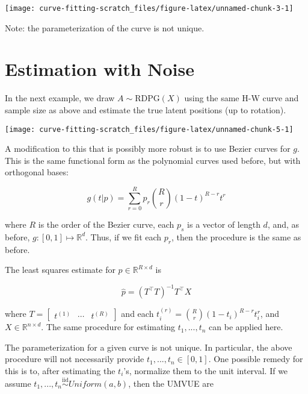 \documentclass[
  11pt,
]{article}
\begin{document}
\begin{center}\texttt{[image: curve-fitting-scratch\_files/figure-latex/unnamed-chunk-3-1]} \end{center}

Note: the parameterization of the curve is not unique.

\hypertarget{estimation-with-noise}{%
\section{Estimation with Noise}\label{estimation-with-noise}}

\begin{example}

In the next example, we draw $A \sim \mathrm{RDPG}(X)$ using the same H-W curve and sample size as above and estimate the true latent positions (up to rotation). 

\end{example}

\begin{center}\texttt{[image: curve-fitting-scratch\_files/figure-latex/unnamed-chunk-5-1]} \end{center}

A modification to this that is possibly more robust is to use Bezier
curves for \(g\). This is the same functional form as the polynomial
curves used before, but with orthogonal bases:

\[g(t | p) = \sum_{r = 0}^{R} p_r \binom{R}{r} (1 - t)^{R - r} t^r\]

where \(R\) is the order of the Bezier curve, each \(p_s\) is a vector
of length \(d\), and, as before, \(g : [0, 1] \mapsto \mathbb{R}^d\).
Thus, if we fit each \(p_r\), then the procedure is the same as before.

The least squares estimate for \(p \in \mathbb{R}^{R \times d}\) is

\[\hat{p} = (T^\top T)^{-1} T^\top X\]

where \(T = \begin{bmatrix} t^{(1)} & \cdots & t^{(R)} \end{bmatrix}\)
and each \(t^{(r)}_i = \binom{R}{r} (1 - t_i)^{R - r} t_i^r\), and
\(X \in \mathbb{R}^{n \times d}\). The same procedure for estimating
\(t_1, ..., t_n\) can be applied here.

The parameterization for a given curve is not unique. In particular, the
above procedure will not necessarily provide
\(t_1, ..., t_n \in [0, 1]\). One possible remedy for this is to, after
estimating the \(t_i\)'s, normalize them to the unit interval. If we
assume \(t_1, ..., t_n \stackrel{\mathrm{iid}}{\sim}Uniform(a, b)\),
then the UMVUE are
\end{document}
